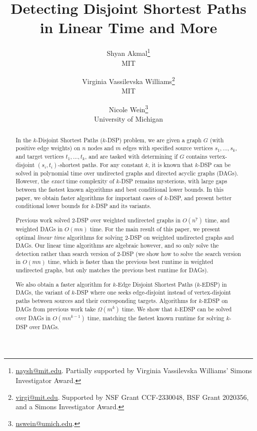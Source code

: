 \documentclass[11pt]{article}
\title{Detecting Disjoint Shortest Paths in Linear Time and More}
\author{
Shyan Akmal\thanks{\url{naysh@mit.edu}. Partially supported by Virginia Vassilevska Williams' Simons Investigator Award.}
\\MIT 
\and 
Virginia Vassilevska Williams\thanks{\url{virgi@mit.edu}. Supported by NSF Grant CCF-2330048, BSF Grant 2020356, and a Simons Investigator Award.}
\\MIT
\and
Nicole Wein\thanks{\url{nswein@umich.edu}.}\\University of Michigan}
\date{\vspace{-3ex}}
\theoremstyle{definition}
\begin{document}
\maketitle

\vspace{-4ex}
\begin{abstract}
    In the \textsf{$k$-Disjoint Shortest Paths ($k$-DSP)} problem, we are given a graph $G$ (with positive edge weights) on $n$ nodes and $m$ edges with specified source vertices $s_1, \dots, s_k$, and target vertices $t_1, \dots, t_k$, and are tasked with determining if $G$ contains vertex-disjoint $(s_i,t_i)$-shortest paths.
    For any constant $k$, it is known that \textsf{$k$-DSP} can be solved in polynomial time over undirected graphs and directed acyclic graphs (DAGs).
     However, the \textit{exact} time complexity of \textsf{$k$-DSP} remains mysterious,
    with large gaps between the fastest known algorithms and best conditional lower bounds.
    In this paper, we obtain faster algorithms for important cases of \textsf{$k$-DSP}, and present better conditional lower bounds for \textsf{$k$-DSP} and its variants.
    
    Previous work solved \textsf{2-DSP} over weighted undirected graphs in $O(n^7)$ time, 
    and weighted DAGs in $O(mn)$ time. 
    For the main result of this paper, we present optimal \emph{linear time}  algorithms for solving \textsf{2-DSP} on weighted undirected graphs and DAGs.
    Our linear time algorithms are algebraic however, and so only solve the detection rather than search version of \textsf{2-DSP} (we show how to solve the search version in $O(mn)$ time, which is  faster than the previous best runtime in weighted undirected graphs, but only matches the previous best runtime for DAGs).

    We also obtain a faster algorithm for \textsf{$k$-Edge Disjoint Shortest Paths ($k$-EDSP)} in DAGs, the variant of \textsf{$k$-DSP} where one seeks edge-disjoint instead of vertex-disjoint paths between sources and their corresponding targets.
    Algorithms for \textsf{$k$-EDSP} on DAGs from previous work take  $\Omega(m^k)$ time.
    We show that \textsf{$k$-EDSP} can be solved over DAGs in $O(mn^{k-1})$ time, matching the fastest known runtime for solving \textsf{$k$-DSP} over DAGs.


\end{abstract}
\end{document}
